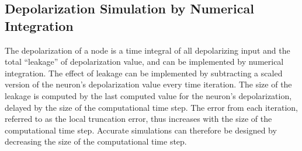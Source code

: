 









\subsection{Depolarization Simulation by Numerical Integration}
	The depolarization of a node is a time integral of all depolarizing input and the total ``leakage'' of depolarization value, and can be implemented by numerical integration.
	The effect of leakage can be implemented by subtracting a scaled version of the neuron's depolarization value every time iteration.
	The size of the leakage is computed by the last computed value for the neuron's depolarization, delayed by the size of the computational time step.
	The error from each iteration, referred to as the local truncation error, thus increases with the size of the computational time step.
	Accurate simulations can therefore be designed by decreasing the size of the computational time step.

